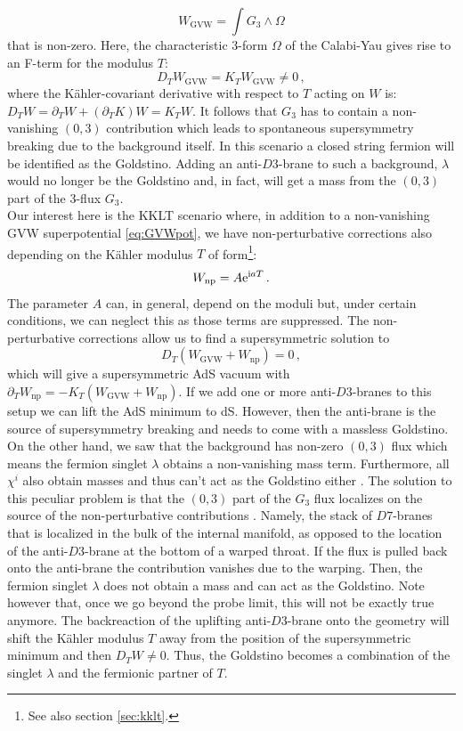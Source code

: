 \documentclass[a4paper,12pt,twoside,openright]{report}
\newcommand{\be}{\begin{equation}}
\newcommand{\ee}{\end{equation}}
\def\rmi{{\rm i}}
\def\rme{{\rm e}}
\begin{document}
\be 
W_{\text{GVW}} = \int G_3 \wedge \Omega
\label{eq:GVWpot}
\ee
that is non-zero. Here, the characteristic 3-form $\Omega$ of the Calabi-Yau gives rise to an F-term for the modulus $T$:
\be 
D_T W_{\text{GVW}} = K_T W_{\text{GVW}} \neq 0\,,
\ee
where the Kähler-covariant derivative with respect to $T$ acting on $W$ is: $D_T W = \partial_T W + (\partial_T K ) W = K_T W$. It follows that $G_3$ has to contain a non-vanishing $(0,3)$ contribution which leads to spontaneous supersymmetry breaking due to the background itself. In this scenario a closed string fermion will be identified as the Goldstino. Adding an anti-$D3$-brane to such a background, $\lambda$ would no longer be the Goldstino and, in fact, will get a mass from the $(0,3)$ part of the 3-flux $G_3$.\\
Our interest here is the KKLT scenario where, in addition to a non-vanishing GVW superpotential \eqref{eq:GVWpot}, we have non-perturbative corrections also depending on the Kähler modulus $T$ of form\footnote{See also section \ref{sec:kklt}.}:
\be 
W_{\text{np}} = A \rme^{\rmi a T}\,.
\ee
The parameter $A$ can, in general, depend on the moduli but, under certain conditions, we can neglect this as those terms are suppressed. The non-perturbative corrections allow us to find a supersymmetric solution to 
\be 
D_T \left( W_{\text{GVW}} + W_{\text{np}} \right)=0\,,
\ee
which will give a supersymmetric AdS vacuum with $\partial_T W_{\text{np}} = - K_T (W_{\text{GVW}} + W_{\text{np}})$. If we add one or more anti-$D3$-branes to this setup we can lift the AdS minimum to dS. However, then the anti-brane is the source of supersymmetry breaking and needs to come with a massless Goldstino. On the other hand, we saw that the background has non-zero $(0,3)$ flux which means the fermion singlet $\lambda$ obtains a non-vanishing mass term. Furthermore, all $\chi^i$ also obtain masses and thus can't act as the Goldstino either \cite{Bergshoeff:2015jxa}. The solution to this peculiar problem is that the $(0,3)$ part of the $G_3$ flux localizes on the source of the non-perturbative contributions \cite{Baumann:2010sx,Dymarsky:2010mf}. Namely, the stack of $D7$-branes that is localized in the bulk of the internal manifold, as opposed to the location of the anti-$D3$-brane at the bottom of a warped throat. If the flux is pulled back onto the anti-brane the contribution vanishes due to the warping. Then, the fermion singlet $\lambda$ does not obtain a mass and can act as the Goldstino. Note however that, once we go beyond the probe limit, this will not be exactly true anymore. The backreaction of the uplifting anti-$D3$-brane onto the geometry will shift the Kähler modulus $T$ away from the position of the supersymmetric minimum and then $D_TW\neq0$. Thus, the Goldstino becomes a combination of the singlet $\lambda$ and the fermionic partner of $T$.\\
\end{document}
